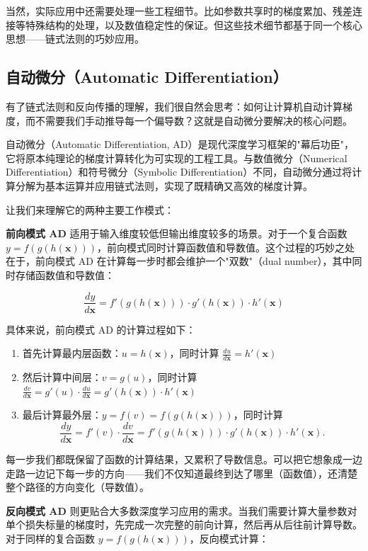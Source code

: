 当然，实际应用中还需要处理一些工程细节。比如参数共享时的梯度累加、残差连接等特殊结构的处理，以及数值稳定性的保证。但这些技术细节都基于同一个核心思想——链式法则的巧妙应用。

\subsection{自动微分（Automatic Differentiation）}

有了链式法则和反向传播的理解，我们很自然会思考：如何让计算机自动计算梯度，而不需要我们手动推导每一个偏导数？这就是自动微分要解决的核心问题。

自动微分（Automatic Differentiation, AD）是现代深度学习框架的"幕后功臣"，它将原本纯理论的梯度计算转化为可实现的工程工具。与数值微分（Numerical Differentiation）和符号微分（Symbolic Differentiation）不同，自动微分通过将计算分解为基本运算并应用链式法则，实现了既精确又高效的梯度计算。

让我们来理解它的两种主要工作模式：

\textbf{前向模式 AD} 适用于输入维度较低但输出维度较多的场景。对于一个复合函数 $y = f(g(h(\mathbf{x})))$，前向模式同时计算函数值和导数值。这个过程的巧妙之处在于，前向模式 AD 在计算每一步时都会维护一个"双数"（dual number），其中同时存储函数值和导数值：

$$\frac{dy}{d\mathbf{x}} = f'(g(h(\mathbf{x}))) \cdot g'(h(\mathbf{x})) \cdot h'(\mathbf{x})$$

具体来说，前向模式 AD 的计算过程如下：
\begin{enumerate}
\item 首先计算最内层函数：$u = h(\mathbf{x})$，同时计算 $\frac{du}{d\mathbf{x}} = h'(\mathbf{x})$
\item 然后计算中间层：$v = g(u)$，同时计算 $\frac{dv}{d\mathbf{x}} = g'(u) \cdot \frac{du}{d\mathbf{x}} = g'(h(\mathbf{x})) \cdot h'(\mathbf{x})$
\item 最后计算最外层：$y = f(v) = f(g(h(\mathbf{x})))$，同时计算
$$\frac{dy}{d\mathbf{x}} = f'(v) \cdot \frac{dv}{d\mathbf{x}} = f'(g(h(\mathbf{x}))) \cdot g'(h(\mathbf{x})) \cdot h'(\mathbf{x}).$$
\end{enumerate}

每一步我们都既保留了函数的计算结果，又累积了导数信息。可以把它想象成一边走路一边记下每一步的方向——我们不仅知道最终到达了哪里（函数值），还清楚整个路径的方向变化（导数值）。

\textbf{反向模式 AD} 则更贴合大多数深度学习应用的需求。当我们需要计算大量参数对单个损失标量的梯度时，先完成一次完整的前向计算，然后再从后往前计算导数。对于同样的复合函数 $y = f(g(h(\mathbf{x})))$，反向模式计算：

